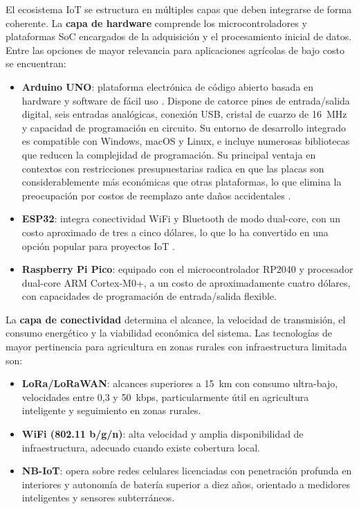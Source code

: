 El ecosistema IoT se estructura en múltiples capas que deben integrarse de forma coherente. La \textbf{capa de hardware} comprende los microcontroladores y plataformas SoC encargados de la adquisición y el procesamiento inicial de datos. Entre las opciones de mayor relevancia para aplicaciones agrícolas de bajo costo se encuentran:

\begin{itemize}
	\item \textbf{Arduino UNO}: plataforma electrónica de código abierto basada en hardware y software de fácil uso \citep{arduinoopensource}. Dispone de catorce pines de entrada/salida digital, seis entradas analógicas, conexión USB, cristal de cuarzo de 16~MHz y capacidad de programación en circuito. Su entorno de desarrollo integrado es compatible con Windows, macOS y Linux, e incluye numerosas bibliotecas que reducen la complejidad de programación. Su principal ventaja en contextos con restricciones presupuestarias radica en que las placas son considerablemente más económicas que otras plataformas, lo que elimina la preocupación por costos de reemplazo ante daños accidentales \citep{arduinoopensource}.
	\item \textbf{ESP32}: integra conectividad WiFi y Bluetooth de modo dual-core, con un costo aproximado de tres a cinco dólares, lo que lo ha convertido en una opción popular para proyectos IoT \citep{quiroz2024transformacion}.
	\item \textbf{Raspberry Pi Pico}: equipado con el microcontrolador RP2040 y procesador dual-core ARM Cortex-M0+, a un costo de aproximadamente cuatro dólares, con capacidades de programación de entrada/salida flexible.
\end{itemize}

La \textbf{capa de conectividad} determina el alcance, la velocidad de transmisión, el consumo energético y la viabilidad económica del sistema. Las tecnologías de mayor pertinencia para agricultura en zonas rurales con infraestructura limitada son:

\begin{itemize}
	\item \textbf{LoRa/LoRaWAN}: alcances superiores a 15~km con consumo ultra-bajo, velocidades entre 0,3 y 50~kbps, particularmente útil en agricultura inteligente y seguimiento en zonas rurales.
	\item \textbf{WiFi (802.11 b/g/n)}: alta velocidad y amplia disponibilidad de infraestructura, adecuado cuando existe cobertura local.
	\item \textbf{NB-IoT}: opera sobre redes celulares licenciadas con penetración profunda en interiores y autonomía de batería superior a diez años, orientado a medidores inteligentes y sensores subterráneos.
\end{itemize}

